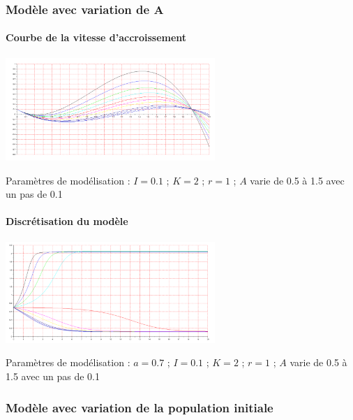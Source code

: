 \documentclass{article}
\begin{document}
\subsubsection{Modèle avec variation de A}

\paragraph{Courbe de la vitesse d'accroissement}
\begin{center}
\includegraphics[width=300px]{img/part1/AlleeA.png}
\end{center}
Paramètres de modélisation : $I=0.1$ ; $K=2$ ; $r=1$  ; $A$ varie de 0.5 à 1.5 avec un pas de 0.1
\paragraph{}

\paragraph{Discrétisation du modèle}
\begin{center}
\includegraphics[width=300px]{img/part1/TrajA.png}
\end{center}
Paramètres de modélisation : $a=0.7$ ; $I=0.1$ ; $K=2$ ; $r=1$  ; $A$ varie de 0.5 à 1.5 avec un pas de 0.1
\paragraph{}

\subsubsection{Modèle avec variation de la population initiale}
\end{document}
